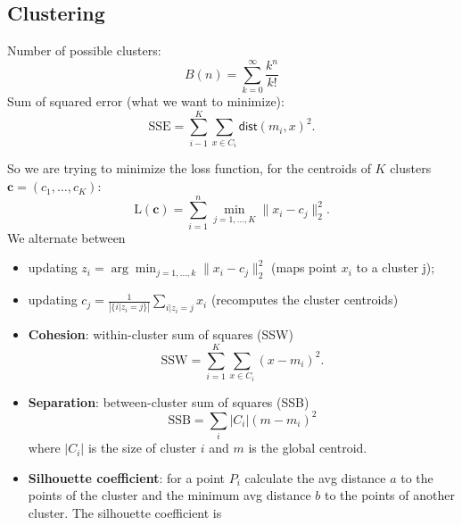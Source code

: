 \documentclass[a4paper,9pt]{extarticle}
\begin{document}
\begin{multicols*}{2}
\section{Clustering}
\begin{riquadro}
	Number of possible clusters:
	\begin{equation*}
		B(n)=\sum_{k=0}^{\infty}\frac{k^{n}}{k!}
	\end{equation*}
	Sum of squared error (what we want to minimize):
	\begin{equation*}
		\mathrm{SSE}=\sum_{i-1}^{K}\sum_{x\in C_i}\mathsf{dist}(m_i,x)^{2}.
	\end{equation*}
\end{riquadro}
So we are trying to minimize the loss function, for the centroids of $K$ clusters $\mathbf{c}=(c_1,\ldots,c_K)$:
\begin{equation*}
	\mathrm{L}(\mathbf{c})=\sum_{i=1}^{n}\min_{j=1,\ldots,K}\lVert x_{i}-c_{j}\rVert^{2}_{2}.
\end{equation*}
We alternate between
\begin{itemize}
	\item updating $z_{i}=\arg\min_{j=1,\ldots,k}\lVert x_{i}-c_{j}\rVert^{2}_{2}$ (maps point $x_{i}$ to a cluster j);
	\item updating $c_{j}=\frac{1}{\left|\{i|z_{i}=j\}\right|}\sum_{i|z_{i}=j}x_{i}$ (recomputes the cluster centroids)
\end{itemize}
\begin{riquadro}
	\begin{itemize}
	\item 	\textbf{Cohesion}: within-cluster sum of squares (SSW)
	\begin{equation*}
		\mathrm{SSW}=\sum_{i=1}^{K}\sum_{x\in C_i}(x-m_{i})^{2}.
	\end{equation*}
	\item \textbf{Separation}: between-cluster sum of squares (SSB)\\
	\begin{equation*}
		\mathrm{SSB}=\sum_{i}|C_{i}|(m-m_i)^{2}
	\end{equation*}
	where $|C_{i}|$ is the size of cluster $i$ and $m$ is the global centroid.\\
	\item \textbf{Silhouette coefficient}: for a point $P_{i}$ calculate the avg distance $a$ to the points of the cluster and the minimum avg distance $b$ to the points of another cluster. The silhouette coefficient is
	\begin{equation*}

\end{equation*}
\end{itemize}
\end{riquadro}
\end{multicols*}
\end{document}
